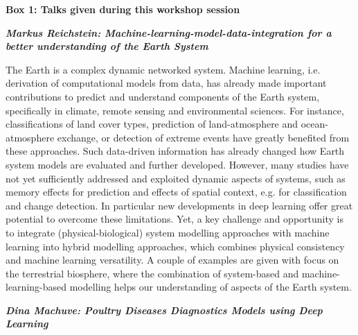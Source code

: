 \textbf{Box 1: Talks given during this workshop session}

\emph{\textbf{Markus Reichstein: Machine-learning-model-data-integration
for a better understanding of the Earth System}}

The Earth is a complex dynamic networked system. Machine learning, i.e.
derivation of computational models from data, has already made important
contributions to predict and understand components of the Earth system,
specifically in climate, remote sensing and environmental sciences. For
instance, classifications of land cover types, prediction of
land-atmosphere and ocean-atmosphere exchange, or detection of extreme
events have greatly benefited from these approaches. Such data-driven
information has already changed how Earth system models are evaluated
and further developed. However, many studies have not yet sufficiently
addressed and exploited dynamic aspects of systems, such as memory
effects for prediction and effects of spatial context, e.g. for
classification and change detection. In particular new developments in
deep learning offer great potential to overcome these limitations. Yet,
a key challenge and opportunity is to integrate (physical-biological)
system modelling approaches with machine learning into hybrid modelling
approaches, which combines physical consistency and machine learning
versatility. A couple of examples are given with focus on the
terrestrial biosphere, where the combination of system-based and
machine-learning-based modelling helps our understanding of aspects of
the Earth system.

\emph{\textbf{Dina Machuve: Poultry Diseases Diagnostics Models using
Deep Learning}}

